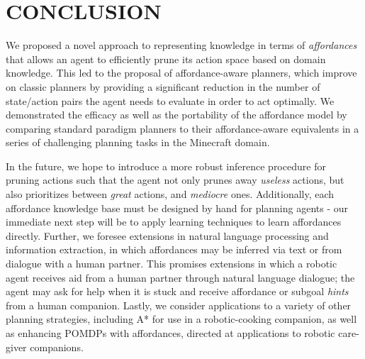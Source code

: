 \documentclass[]{article}
\begin{document}


\section{CONCLUSION}

We proposed a novel approach to representing knowledge in terms of
{\em affordances}~\citep{gibson77} that allows an agent to efficiently
prune its action space based on domain knowledge. This led to the 
proposal of affordance-aware planners, which improve on classic planners
by providing a significant reduction in the number of state/action pairs the
agent needs to evaluate in order to act optimally. We demonstrated the efficacy 
as well as the portability of the affordance model by comparing standard paradigm
planners to their affordance-aware equivalents in a series of challenging planning tasks in the Minecraft
domain.

In the future, we hope to introduce a more robust inference procedure for pruning actions such that
the agent not only prunes away {\it useless} actions, but also prioritizes between
{\it great} actions, and {\it mediocre} ones. Additionally, each affordance knowledge base
must be designed by hand for planning agents - our immediate next step will be to
apply learning techniques to learn affordances directly.
Further, we foresee extensions in natural language processing and information
extraction, in which affordances may be inferred via text or from dialogue with a human partner.
This promises extensions in which a robotic agent receives aid from a human partner through natural language
dialogue; the agent may ask for help when it is stuck and
receive affordance or subgoal {\it hints} from a human companion. Lastly, we consider applications to a variety of other planning
strategies, including A* for use in a robotic-cooking companion, as well as enhancing POMDPs with affordances, directed at applications to robotic care-giver companions.

{\small

  
}
\end{document}
